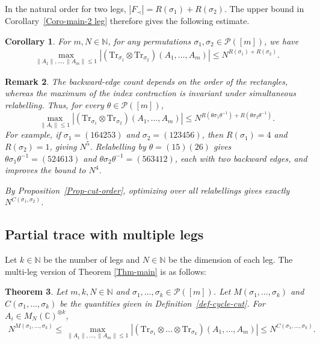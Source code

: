\documentclass[12pt]{article}
\numberwithin{equation}{section}
\theoremstyle{plain}
\newtheorem{theorem}{Theorem}[section]
\newtheorem{corollary}[theorem]{Corollary}
\newtheorem{remark}[theorem]{Remark}
\def\bN{\mathbb N}
\def\bC{\mathbb C}
\def\cP{\mathcal P}
\def\Tr{\mathrm {Tr}}
\begin{document}
In the natural order for two legs, $|F_\prec|=R(\sigma_1)+R(\sigma_2)$. The upper bound in Corollary~\ref{Coro-main-2 leg} therefore gives the following estimate.

\begin{corollary} \label{Coro-2 leg-backward}
For $m,N \in \bN$, for any permutations $\sigma_1,\sigma_2 \in \cP([m])$, we have
\begin{align*}
    \max_{\|A_1\|,\ldots,\|A_m\| \le 1} \left| \left( \Tr_{\sigma_1} \otimes \Tr_{\sigma_2} \right) \left( A_1, \ldots, A_m \right) \right|
    \le N^{R(\sigma_1) + R(\sigma_2)}.
\end{align*}
\end{corollary}

\begin{remark}
The backward-edge count depends on the order of the rectangles, whereas the maximum of the index contraction is invariant under simultaneous relabelling. Thus, for every $\theta\in\cP([m])$,
\[
\max_{\|A_i\|\le1}|(\Tr_{\sigma_1}\otimes\Tr_{\sigma_2})(A_1,\ldots,A_m)|
\le N^{R(\theta\sigma_1\theta^{-1})+R(\theta\sigma_2\theta^{-1})}.
\]
For example, if $\sigma_1=(164253)$ and $\sigma_2=(123456)$, then $R(\sigma_1)=4$ and $R(\sigma_2)=1$, giving $N^5$. Relabelling by $\theta=(15)(26)$ gives $\theta\sigma_1\theta^{-1}=(524613)$ and $\theta\sigma_2\theta^{-1}=(563412)$, each with two backward edges, and improves the bound to $N^4$.

By Proposition~\ref{Prop-cut-order}, optimizing over all relabellings gives exactly $N^{C(\sigma_1,\sigma_2)}$.
\end{remark}

\subsection{Partial trace with multiple legs}

Let $k \in \bN$ be the number of legs and $N \in \bN$ be the dimension of each leg. The multi-leg version of Theorem \ref{Thm-main} is as follows:

\begin{theorem} \label{Thm-main-multi}
Let $m,k,N\in\bN$ and $\sigma_1,\ldots,\sigma_k\in\cP([m])$. Let $M(\sigma_1,\ldots,\sigma_k)$ and $C(\sigma_1,\ldots,\sigma_k)$ be the quantities given in Definition~\ref{def-cycle-cut}. For $A_i\in M_N(\bC)^{\otimes k}$,
\begin{align*}
    N^{M(\sigma_1,\ldots,\sigma_k)} \le
    \max_{\|A_1\|,\ldots,\|A_m\| \le 1} \left| \left( \Tr_{\sigma_1} \otimes \ldots \otimes \Tr_{\sigma_k} \right) \left( A_1, \ldots, A_m \right) \right|
    \le N^{C(\sigma_1,\ldots,\sigma_k)}.
\end{align*}
\end{theorem}
\end{document}

